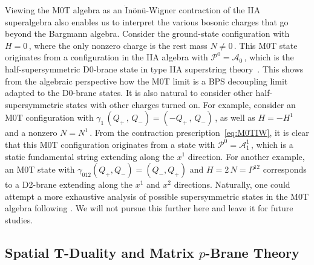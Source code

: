 \documentclass[11pt]{article}
\begin{document}
Viewing the M0T algebra as an $\dot{\text{I}}$nönü-Wigner contraction of the IIA superalgebra also enables us to interpret the various bosonic charges that go beyond the Bargmann algebra.
Consider the ground-state configuration with $H=0$\,, where the only nonzero charge is the rest mass $N\neq 0$\,. This M0T state originates from a configuration in the IIA algebra with $\mathcal{P}^0=\mathcal{A}_0$\,, which is the half-supersymmetric D0-brane state in type IIA superstring theory~\cite{Townsend:1997wg}. This shows from the algebraic perspective how the M0T limit is a BPS decoupling limit adapted to the D0-brane states. It is also natural to consider other half-supersymmetric states with other charges turned on. For example, consider an M0T configuration with $\gamma^{}_1 \, (Q_+\,, \, Q_-) = (-Q_+\,, \, Q_-)$\,, as well as $H=-H^1$ and a nonzero $N = N^1$\,. From the contraction prescription~\eqref{eq:M0TIW}, it is clear that this M0T configuration originates from a state with $\mathcal{P}^0=\mathcal{A}_1^1$\,, which is a static fundamental string extending along the $x^1$ direction. For another example, an M0T state with $\gamma^{}_{012}(Q_+,Q_-) = (Q_-,Q_+)$ and $H=2\,N = P^{12}$ corresponds to a D2-brane extending along the $x^1$ and $x^2$ directions. Naturally, one could attempt a more exhaustive analysis of possible supersymmetric states in the M0T algebra following \cite{Townsend:1997wg}. We will not pursue this further here and leave it for future studies.



\subsection{Spatial T-Duality and Matrix \texorpdfstring{$p$}{p}-Brane Theory} \label{sec:stdmpt}
\end{document}
